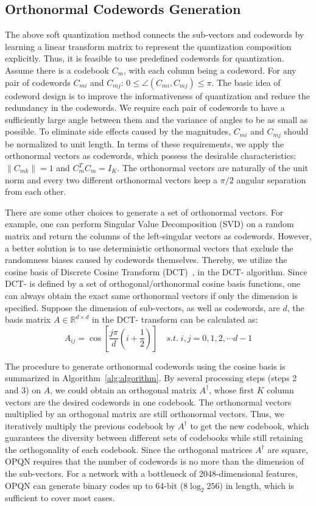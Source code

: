 \documentclass{elsarticle}
\newcommand{\RNum}[1]{\uppercase\expandafter{\romannumeral #1\relax}}
\begin{document}
\subsection{Orthonormal Codewords Generation}
The above soft quantization method connects the sub-vectors and codewords by learning a linear transform matrix to represent the quantization composition explicitly. Thus, it is feasible to use predefined codewords for quantization. Assume there is a codebook $C_m$, with each column being a codeword. For any pair of codewords $C_{mi}$ and $C_{mj}$: $ 0 \leq \angle (C_{mi}, C_{mj}) \leq \pi$. The basic idea of codeword design is to improve the informativeness of quantization and reduce the redundancy in the codewords. We require each pair of codewords to have a sufficiently large angle between them and the variance of angles to be as small as possible. To eliminate side effects caused by the magnitudes, $C_{mi}$ and $C_{mj}$ should be normalized to unit length. In terms of these requirements, we apply the orthonormal vectors as codewords, which possess the desirable characteristics: $\|C_{mk}\|=1$ and $C_m^TC_m = I_K$. The orthonormal vectors are naturally of the unit norm and every two different orthonormal vectors keep a $\pi/2$ angular separation from each other. 

There are some other choices to generate a set of orthonormal vectors. For example, one can perform Singular Value Decomposition (SVD) on a random matrix and return the columns of the left-singular vectors as codewords. However, a better solution is to use deterministic orthonormal vectors that exclude the randomness biases caused by codewords themselves. Thereby, we utilize the cosine basis of Discrete Cosine Transform (DCT)~\cite{ahmed1974discrete}, in the DCT-\RNum{2} algorithm. Since DCT-\RNum{2} is defined by a set of orthogonal/orthonormal cosine basis functions, one can always obtain the exact same orthonormal vectors if only the dimension is specified. Suppose the dimension of sub-vectors, as well as codewords, are $d$, the basis matrix $A \in \mathbb{R}^{d \times d}$ in the DCT-\RNum{2} transform can be calculated as:
\begin{equation}
    A_{ij} = \cos{[\frac{j \pi}{d}(i+\frac{1}{2})]} \quad s.t. \; i, j=0,1,2,\cdots d-1
    \label{21}
\end{equation}

The procedure to generate orthonormal codewords using the cosine basis is summarized in Algorithm~\ref{alg:algorithm}. By several processing steps (steps 2 and 3) on $A$, we could obtain an orthogonal matrix $A^{\dagger}$, whose first $K$ column vectors are the desired codewords in one codebook. The orthonormal vectors multiplied by an orthogonal matrix are still orthonormal vectors. Thus, we iteratively multiply the previous codebook by $A^{\dagger}$ to get the new codebook, which guarantees the diversity between different sets of codebooks while still retaining the orthogonality of each codebook. Since the orthogonal matrices $A^{\dagger}$ are square, OPQN requires that the number of codewords is no more than the dimension of the sub-vectors. For a network with a bottleneck of 2048-dimensional features, OPQN can generate binary codes up to 64-bit ($8 \log_2 256$) in length, which is sufficient to cover most cases. 
\end{document}
